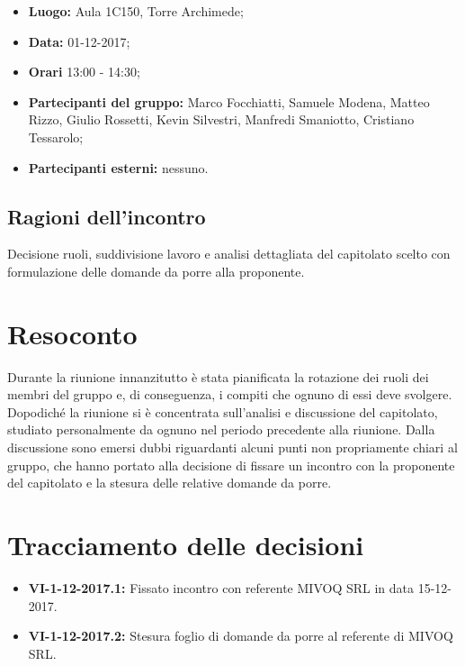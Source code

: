 \documentclass[openany,12pt,a4paper]{article}
\begin{document}
	\begin{itemize} 
	    \item \textbf{Luogo:} Aula 1C150, Torre Archimede;
	    \item \textbf{Data:} 01-12-2017;
	    \item \textbf{Orari} 13:00 - 14:30;
	    \item \textbf{Partecipanti del gruppo:} Marco Focchiatti, Samuele Modena, Matteo Rizzo, Giulio Rossetti, Kevin Silvestri, Manfredi Smaniotto, Cristiano Tessarolo;
	    \item \textbf{Partecipanti esterni:} nessuno.
	\end{itemize}
	
	\subsection{Ragioni dell'incontro}
	
	Decisione ruoli, suddivisione lavoro e analisi dettagliata del capitolato scelto con formulazione delle domande da porre alla proponente.

	\section{Resoconto}
	
	Durante la riunione innanzitutto è stata pianificata la rotazione dei ruoli dei membri del gruppo e, di conseguenza, i compiti che ognuno di essi deve svolgere. Dopodiché la riunione si è concentrata sull'analisi e discussione del capitolato, studiato personalmente da ognuno nel periodo precedente alla riunione. Dalla discussione sono emersi dubbi riguardanti alcuni punti non propriamente chiari al gruppo, che hanno portato alla decisione di fissare un incontro con la proponente del capitolato e la stesura  delle relative domande da porre.  
	
	\section{Tracciamento delle decisioni}
	
	\begin{itemize}
	    \item \textbf{VI-1-12-2017.1:} Fissato incontro con referente MIVOQ SRL in data 15-12-2017.
	    \item \textbf{VI-1-12-2017.2:} Stesura foglio di domande da porre al referente di MIVOQ SRL.
	\end{itemize}	

	
\end{document}
